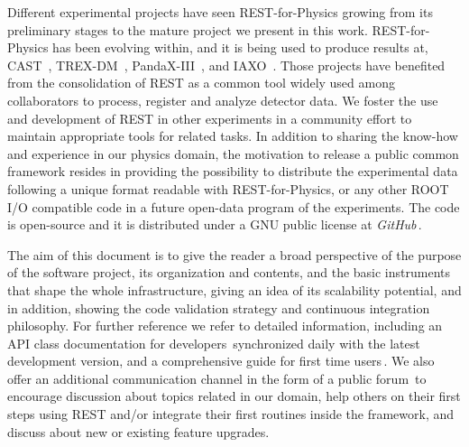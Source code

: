 
Different experimental projects have seen REST-for-Physics growing from its preliminary stages to the mature project we present in this work. REST-for-Physics has been evolving within, and it is being used to produce results at, CAST~\cite{Anastassopoulos:2017ftl}, TREX-DM~\cite{trexdm_bckmodel}, PandaX-III~\cite{pandaxiii_cdr,Lin:2018mpd,Galan:2019ake}, and IAXO~\cite{Armengaud:2019uso}. Those projects have benefited from the consolidation of REST as a common tool widely used among collaborators to process, register and analyze detector data. We foster the use and development of REST in other experiments in a community effort to maintain appropriate tools for related tasks. In addition to sharing the know-how and experience in our physics domain, the motivation to release a public common framework resides in providing the possibility to distribute the experimental data following a unique format readable with REST-for-Physics, or any other ROOT I/O compatible code in a future open-data program of the experiments. The code is open-source and it is distributed under a GNU public license at \emph{GitHub}\,\cite{REST_Git}.

The aim of this document is to give the reader a broad perspective of the purpose of the software project, its organization and contents, and the basic instruments that shape the whole infrastructure, giving an idea of its scalability potential, and in addition, showing the code validation strategy and continuous integration philosophy. For further reference we refer to detailed information, including an API class documentation for developers\,\cite{REST_API}  synchronized daily with the latest development version, and a comprehensive guide for first time users\,\cite{REST_user_guide}. We also offer an additional communication channel in the form of a public forum\,\cite{REST_forum} to encourage discussion about topics related in our domain, help others on their first steps using REST and/or integrate their first routines inside the framework, and discuss about new or existing feature upgrades.